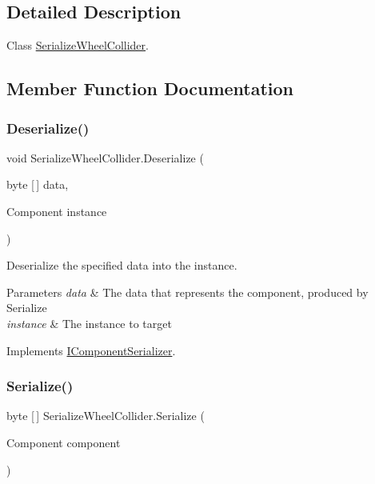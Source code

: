 \subsection{Detailed Description}
Class \hyperlink{class_serialize_wheel_collider}{Serialize\+Wheel\+Collider}. 



\subsection{Member Function Documentation}
\mbox{\label{class_serialize_wheel_collider_aa0fb4372a07823644b82f0fc968b4fcf}} 
\subsubsection{\texorpdfstring{Deserialize()}{Deserialize()}}
{\footnotesize\ttfamily void Serialize\+Wheel\+Collider.\+Deserialize (\begin{DoxyParamCaption}\item[{byte \mbox{[}$\,$\mbox{]}}]{data,  }\item[{Component}]{instance }\end{DoxyParamCaption})\hspace{0.3cm}{\ttfamily [inline]}}



Deserialize the specified data into the instance. 


\begin{DoxyParams}{Parameters}
{\em data} & The data that represents the component, produced by Serialize\\
\hline
{\em instance} & The instance to target\\
\hline
\end{DoxyParams}


Implements \hyperlink{interface_i_component_serializer_a4cc366a5c78b33d47a90c209d8fed883}{I\+Component\+Serializer}.

\mbox{\label{class_serialize_wheel_collider_aeecc61865e7331afb0436aae4f53dc4d}} 
\subsubsection{\texorpdfstring{Serialize()}{Serialize()}}
{\footnotesize\ttfamily byte \mbox{[}$\,$\mbox{]} Serialize\+Wheel\+Collider.\+Serialize (\begin{DoxyParamCaption}\item[{Component}]{component }\end{DoxyParamCaption})\hspace{0.3cm}{\ttfamily [inline]}}



